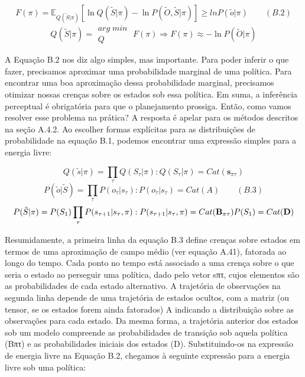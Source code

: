 \documentclass[
  12pt,
]{book}
\begin{document}
\[ F(\pi)=\mathbb E_{Q(\tilde S|\pi)}[\ln Q(\tilde S|\pi)-\ln P(\tilde O, \tilde S|\pi)]\ge ln P(\tilde o|\pi)  \qquad (B.2)\]
\[Q(\tilde S|\pi) = \begin{matrix}arg\; min\;\\Q \end{matrix} F(\pi) \Rightarrow F(\pi) \approx - \ln P(\tilde O|\pi)  \]

A Equação B.2 nos diz algo simples, mas importante. Para poder inferir o que fazer, precisamos aproximar uma probabilidade marginal de uma política. Para encontrar uma boa aproximação dessa probabilidade marginal, precisamos otimizar nossas crenças sobre os estados sob essa política. Em suma, a inferência perceptual é obrigatória para que o planejamento prossiga. Então, como vamos resolver esse problema na prática? A resposta é apelar para os métodos descritos na seção A.4.2. Ao escolher formas explícitas para as distribuições de probabilidade na equação B.1, podemos encontrar uma expressão simples para a energia livre:

\[Q(\tilde s|\pi) = \prod_\tau Q(S_\tau|\pi):Q(S_\tau|\pi)=Cat(\mathbf s_{\pi\tau})\]
\[P(\tilde o | \tilde S) = \prod_\tau P(o_\tau|s_\tau):P(o_\tau|s_\tau)=Cat(A) \qquad (B.3)\]
\[P(\tilde S|\pi) = P(S_1)\prod_\tau P(s_{\tau+1}|s_\tau,\pi):P(s_{\tau+1}|s_\tau,\pi)=Cat(\mathbf B_{\pi\tau}) \\P(S_1) = Cat(\mathbf D)\]

Resumidamente, a primeira linha da equação B.3 define crenças sobre estados em termos de uma aproximação de campo médio (ver equação A.41), fatorada ao longo do tempo. Cada ponto no tempo está associado a uma crença sobre o que seria o estado ao perseguir uma política, dado pelo vetor sπτ, cujos elementos são as probabilidades de cada estado alternativo. A trajetória de observações na segunda linha depende de uma trajetória de estados ocultos, com a matriz (ou tensor, se os estados forem ainda fatorados) A indicando a distribuição sobre as observações para cada estado. Da mesma forma, a trajetória anterior dos estados sob um modelo compreende as probabilidades de transição sob aquela política (Bπτ) e as probabilidades iniciais dos estados (D). Substituindo-os na expressão de energia livre na Equação B.2, chegamos à seguinte expressão para a energia livre sob uma política:
\end{document}
